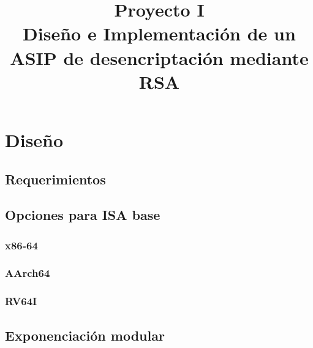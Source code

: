 \documentclass[conference, 14pt]{IEEEtran}
\begin{document}
\makeatletter
\newcommand{\linebreakand}{%
  \end{@IEEEauthorhalign}
  \hfill\mbox{}\par
  \mbox{}\hfill\begin{@IEEEauthorhalign}
}

\title{Proyecto I\\%
	\LARGE{Diseño e Implementación de un ASIP de desencriptación mediante RSA}}

\author{
	}

\maketitle

\pagestyle{plain}
\thispagestyle{plain}

\section{Diseño}

\subsection{Requerimientos}

\subsection{Opciones para ISA base}

\subsubsection{x86-64}

\subsubsection{AArch64}

\subsubsection{RV64I}

\subsection{Exponenciación modular}
\end{document}
